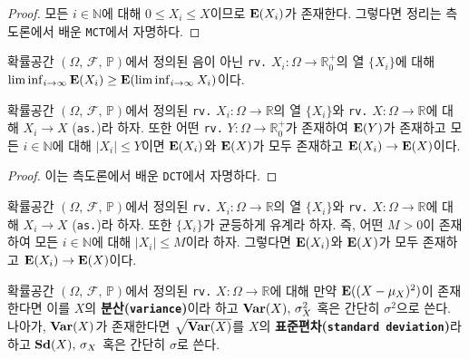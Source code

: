 \begin{proof}
    모든 $i\in\mathbb{N}$에 대해 $0\leq X_i\leq X$이므로 $\mathbf{E}(X_i)$가 존재한다. 그렇다면 정리는 측도론에서 배운 \texttt{MCT}에서 자명하다.
\end{proof}

\begin{theorem}
    확률공간 $(\Omega,\,\mathcal{F},\,\mathbb{P})$에서 정의된 음이 아닌 \texttt{rv.} $X_i:\Omega\to\mathbb{R}^+_0$의 열 $\{X_i\}$에 대해 $\liminf_{i\to\infty}\mathbf{E}(X_i)\geq\mathbf{E}(\liminf_{i\to\infty}X_i)$이다.
\end{theorem}

\begin{theorem}
    확률공간 $(\Omega,\,\mathcal{F},\,\mathbb{P})$에서 정의된 \texttt{rv.} $X_i:\Omega\to\mathbb{R}$의 열 $\{X_i\}$와 \texttt{rv.} $X:\Omega\to\mathbb{R}$에 대해 $X_i\to X$ (\texttt{as.})라 하자. 또한 어떤 \texttt{rv.} $Y:\Omega\to\mathbb{R}^+_0$가 존재하여 $\mathbf{E}(Y)$가 존재하고 모든 $i\in\mathbb{N}$에 대해 $|X_i|\leq Y$이면 $\mathbf{E}(X_i)$와 $\mathbf{E}(X)$가 모두 존재하고 $\mathbf{E}(X_i)\to\mathbf{E}(X)$이다.
\end{theorem}

\begin{proof}
    이는 측도론에서 배운 \texttt{DCT}에서 자명하다.
\end{proof}

\begin{corollary}
    확률공간 $(\Omega,\,\mathcal{F},\,\mathbb{P})$에서 정의된 \texttt{rv.} $X_i:\Omega\to\mathbb{R}$의 열 $\{X_i\}$와 \texttt{rv.} $X:\Omega\to\mathbb{R}$에 대해 $X_i\to X$ (\texttt{as.})라 하자. 또한 $\{X_i\}$가 균등하게 유계라 하자. 즉, 어떤 $M>0$이 존재하여 모든 $i\in\mathbb{N}$에 대해 $|X_i|\leq M$이라 하자. 그렇다면 $\mathbf{E}(X_i)$와 $\mathbf{E}(X)$가 모두 존재하고 $\mathbf{E}(X_i)\to\mathbf{E}(X)$이다.
\end{corollary}

\begin{definition}
    확률공간 $(\Omega,\,\mathcal{F},\,\mathbb{P})$에서 정의된 \texttt{rv.} $X:\Omega\to\mathbb{R}$에 대해 만약 $\mathbf{E}((X-\mu_X)^2)$이 존재한다면 이를 $X$의 \textbf{분산(\texttt{variance})}이라 하고 $\mathbf{Var}(X),\,\sigma_X^2$ 혹은 간단히 $\sigma^2$으로 쓴다. 나아가, $\mathbf{Var}(X)$가 존재한다면 $\sqrt{\mathbf{Var}(X)}$를 $X$의 \textbf{표준편차(\texttt{standard deviation})}라 하고 $\mathbf{Sd}(X),\,\sigma_X$ 혹은 간단히 $\sigma$로 쓴다.
\end{definition}

